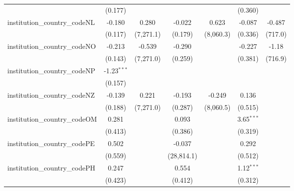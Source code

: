 \begin{tabular}{lcccccc}
                                         & (0.177)        &               &                &                & (0.360)        &   \\   
   institution\_country\_codeNL          & -0.180         & 0.280         & -0.022         & 0.623          & -0.087         & -0.487\\   
                                         & (0.117)        & (7,271.1)     & (0.179)        & (8,060.3)      & (0.336)        & (717.0)\\   
   institution\_country\_codeNO          & -0.213         & -0.539        & -0.290         &                & -0.227         & -1.18\\   
                                         & (0.143)        & (7,271.0)     & (0.259)        &                & (0.381)        & (716.9)\\   
   institution\_country\_codeNP          & -1.23$^{***}$  &               &                &                &                &   \\   
                                         & (0.157)        &               &                &                &                &   \\   
   institution\_country\_codeNZ          & -0.139         & 0.221         & -0.193         & -0.249         & 0.136          &   \\   
                                         & (0.188)        & (7,271.0)     & (0.287)        & (8,060.5)      & (0.515)        &   \\   
   institution\_country\_codeOM          & 0.281          &               & 0.093          &                & 3.65$^{***}$   &   \\   
                                         & (0.413)        &               & (0.386)        &                & (0.319)        &   \\   
   institution\_country\_codePE          & 0.502          &               & -0.037         &                & 0.292          &   \\   
                                         & (0.559)        &               & (28,814.1)     &                & (0.512)        &   \\   
   institution\_country\_codePH          & 0.247          &               & 0.554          &                & 1.12$^{***}$   &   \\   
                                         & (0.423)        &               & (0.412)        &                & (0.312)        &   \\   

\end{tabular}
